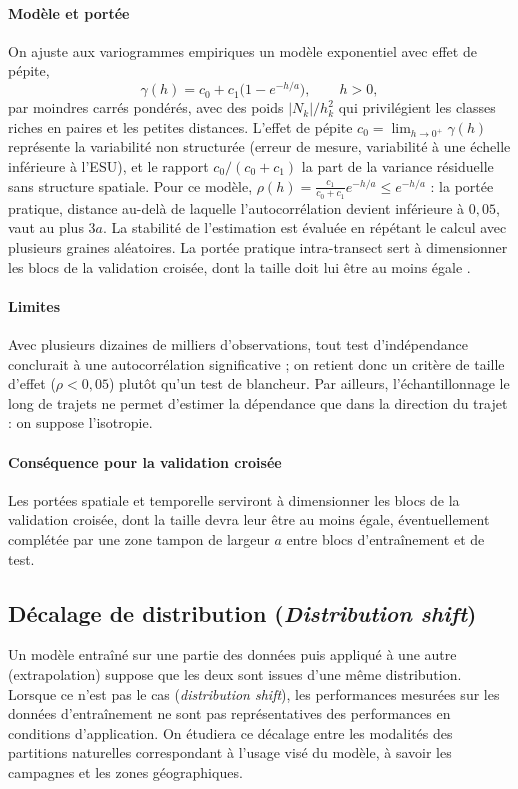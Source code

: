 		\paragraph{Modèle et portée}
			On ajuste aux variogrammes empiriques un modèle exponentiel avec effet de pépite,
			\[
			\gamma(h) = c_0 + c_1\bigl(1 - e^{-h/a}\bigr), \qquad h > 0,
			\]
			par moindres carrés pondérés, avec des poids $|N_k|/h_k^2$ qui privilégient les classes riches en paires et les petites distances. L'effet de pépite $c_0 = \lim_{h \to 0^+} \gamma(h)$ représente la variabilité non structurée (erreur de mesure, variabilité à une échelle inférieure à l'ESU), et le rapport $c_0/(c_0 + c_1)$ la part de la variance résiduelle sans structure spatiale. Pour ce modèle, $\rho(h) = \frac{c_1}{c_0 + c_1} e^{-h/a} \le e^{-h/a}$ : la portée pratique, distance au-delà de laquelle l'autocorrélation devient inférieure à $0{,}05$, vaut au plus $3a$. La stabilité de l'estimation est évaluée en répétant le calcul avec plusieurs graines aléatoires. La portée pratique intra-transect sert à dimensionner les blocs de la validation croisée, dont la taille doit lui être au moins égale \cite{roberts2017}.
		
		\paragraph{Limites}
			Avec plusieurs dizaines de milliers d'observations, tout test d'indépendance conclurait à une autocorrélation significative ; on retient donc un critère de taille d'effet ($\rho < 0{,}05$) plutôt qu'un test de blancheur. Par ailleurs, l'échantillonnage le long de trajets ne permet d'estimer la dépendance que dans la direction du trajet : on suppose l'isotropie.
		
		\paragraph{Conséquence pour la validation croisée}
			Les portées spatiale et temporelle serviront à dimensionner les blocs de la validation croisée, dont la taille devra leur être au moins égale, éventuellement complétée par une zone tampon de largeur $a$ entre blocs d'entraînement et de test.
	
	\subsection{Décalage de distribution (\textit{Distribution shift})}
		Un modèle entraîné sur une partie des données puis appliqué à une autre (extrapolation) suppose que les deux sont issues d'une même distribution. Lorsque ce n'est pas le cas (\textit{distribution shift}), les performances mesurées sur les données d'entraînement ne sont pas représentatives des performances en conditions d'application. On étudiera ce décalage entre les modalités des partitions naturelles correspondant à l'usage visé du modèle, à savoir les campagnes et les zones géographiques.
		

